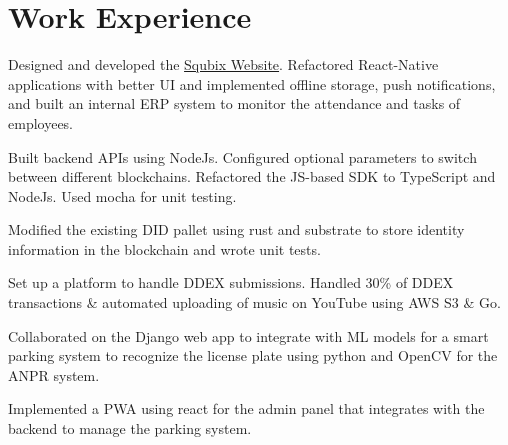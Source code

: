 \documentclass[]{assets/deedy-resume-openfont}
\begin{document}
  \section{Work Experience}
  \hfill {}
      \begin{tightemize}
       \item Designed and developed the {\href{https://squbix.com/}{Squbix Website}}. Refactored React-Native applications with better UI and implemented offline storage, push notifications, and built an internal ERP system to monitor the attendance and tasks of employees.
       \item Built backend APIs using NodeJs. Configured optional parameters to switch between different blockchains. Refactored the JS-based SDK to TypeScript and NodeJs. Used mocha for unit testing.
       \item Modified the existing DID pallet using rust and substrate to store identity information in the blockchain and wrote unit tests. 
      \end{tightemize}
      \sectionsep
  \hfill {}
      \begin{tightemize}
    \item Set up a platform to handle DDEX submissions. Handled 30\% of DDEX transactions \& automated uploading of music on YouTube using AWS S3 \& Go.
\end{tightemize}
      \sectionsep
  \hfill {}
      \begin{tightemize}
    \item Collaborated on the Django web app to integrate with ML models for a smart parking system to recognize the license plate using python and OpenCV for the ANPR system. 
    \item Implemented a PWA using react for the admin panel that integrates with the backend to manage the parking system.
\end{tightemize}
      \sectionsep
%
%
\end{document}
